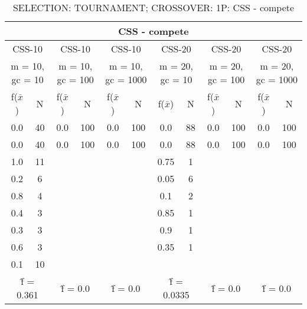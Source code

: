 \begin{table}[H]
	\centering
	\caption{SELECTION: TOURNAMENT; CROSSOVER: 1P: CSS - compete}
	\begin{adjustbox}{width=1\textwidth}
		\begin{tabular}{ |c|c||c|c||c|c||c|c||c|c||c|c| }
			\hline
			\multicolumn{12}{|c|}{CSS - compete} \\
			\hline
			\multicolumn{2}{|c||}{CSS-10} & \multicolumn{2}{c||}{CSS-10} & \multicolumn{2}{c||}{CSS-10} & \multicolumn{2}{c||}{CSS-20} & \multicolumn{2}{c||}{CSS-20} & \multicolumn{2}{c|}{CSS-20}\\
			\hline
			\multicolumn{2}{|c||}{m = 10, gc = 10} & \multicolumn{2}{c||}{m = 10, gc = 100} & \multicolumn{2}{c||}{m = 10, gc = 1000} & \multicolumn{2}{c||}{m = 20, gc = 10} & \multicolumn{2}{c||}{m = 20, gc = 100} & \multicolumn{2}{c|}{m = 20, gc = 1000}\\
			\hline
			f($\bar{x}$) & N & f($\bar{x}$) & N & f($\bar{x}$) & N & f($\bar{x}$) & N & f($\bar{x}$) & N & f($\bar{x}$) & N\\
			\hline
			\hline
			0.0 & 40 & 0.0 & 100 & 0.0 & 100 & 0.0 & 88 & 0.0 & 100 & 0.0 & 100\\
			\hline
			0.0 & 40 & 0.0 & 100 & 0.0 & 100 & 0.0 & 88 & 0.0 & 100 & 0.0 & 100\\
			1.0 & 11 &   &   &   &   & 0.75 & 1 &   &   &   &  \\
			0.2 & 6 &   &   &   &   & 0.05 & 6 &   &   &   &  \\
			0.8 & 4 &   &   &   &   & 0.1 & 2 &   &   &   &  \\
			0.4 & 3 &   &   &   &   & 0.85 & 1 &   &   &   &  \\
			0.3 & 3 &   &   &   &   & 0.9 & 1 &   &   &   &  \\
			0.6 & 3 &   &   &   &   & 0.35 & 1 &   &   &   &  \\
			0.1 & 10 &   &   &   &   &   &   &   &   &   &  \\
			\hline
			\multicolumn{2}{|c||}{\^{f} = 0.361} & \multicolumn{2}{c||}{\^{f} = 0.0} & \multicolumn{2}{c||}{\^{f} = 0.0} & \multicolumn{2}{c||}{\^{f} = 0.0335} & \multicolumn{2}{c||}{\^{f} = 0.0} & \multicolumn{2}{c|}{\^{f} = 0.0}\\
			\hline
		\end{tabular}
	\end{adjustbox}
\end{table}

